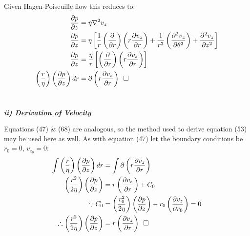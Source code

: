 \documentclass[titlepage]{article}
\begin{document}
    \noindent Given Hagen-Poiseuille flow this reduces to:
    \begin{align}    
        \displaystyle\frac{\partial{p}}{\partial{z}}&=\eta\nabla^2v_{z} \\ 
        \displaystyle\frac{\partial{p}}{\partial{z}}&=\eta\left[\displaystyle\frac{1}{r}\left(\displaystyle\frac{\partial}{\partial{r}}\right)\left(r\displaystyle\frac{\partial{v_{z}}}{\partial{r}}\right)+\displaystyle\frac{1}{r^2}\left(\displaystyle\frac{\partial^2{v_{z}}}{\partial{\theta^2}}\right)+\displaystyle\frac{\partial^2{v_{z}}}{\partial{z^2}}\right] \\
        \displaystyle\frac{\partial{p}}{\partial{z}}&=\displaystyle\frac{\eta}{r}\left[\left(\displaystyle\frac{\partial}{\partial{r}}\right)\left(r\displaystyle\frac{\partial{v_{z}}}{\partial{r}}\right)\right] \\
        \left(\displaystyle\frac{r}{\eta}\right)\left(\displaystyle\frac{\partial{p}}{\partial{z}}\right)dr&=\partial\left(r\displaystyle\frac{\partial{v_{z}}}{\partial{r}}\right)\hspace*{5pt}\square
        \end{align}
    \\
    \begin{center}
        \textbf{\emph{ii) Derivation of Velocity}}
    \end{center}
    \noindent Equations (47) \& (68) are analogous, so the method used to derive equation (53) may be used here as well. As with equation (47) let the boundary conditions be $r_{0}=0$, $v_{z_{0}}=0$:
    \begingroup
        \addtolength\jot{6pt}
        \begin{align}
            \int{\left(\displaystyle\frac{r}{\eta}\right)\left(\displaystyle\frac{\partial{p}}{\partial{z}}\right)dr}&=\int{\partial\left(r\displaystyle\frac{\partial{v_{z}}}{\partial{r}}\right)} \\
            \left(\displaystyle\frac{r^2}{2\eta}\right)\left(\frac{\partial{p}}{\partial{z}}\right)&=r\left(\displaystyle\frac{\partial{v_{z}}}{\partial{r}}\right)+C_{0}\\
            \because C_{0}&=\left(\displaystyle\frac{r_{0}^2}{2\eta}\right)\left(\frac{\partial{p}}{\partial{z}}\right)-r_{0}\left(\displaystyle\frac{\partial{v_{z}}}{\partial{r_{0}}}\right)=0\\
            \therefore\left(\displaystyle\frac{r^2}{2\eta}\right)\left(\frac{\partial{p}}{\partial{z}}\right)&=r\left(\displaystyle\frac{\partial{v_{z}}}{\partial{r}}\right)\hspace*{5pt}\square
        \end{align}
    \endgroup
\end{document}
